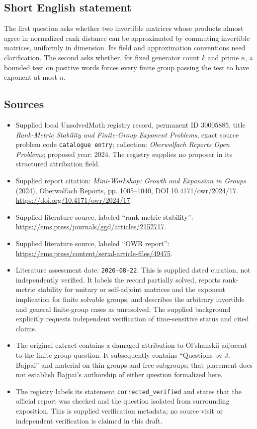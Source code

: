 \documentclass[11pt]{article}
\begin{document}
\subsection{Short English statement}
The first question asks whether two invertible matrices whose products almost agree in normalized rank distance can be approximated by commuting invertible matrices, uniformly in dimension. Its field and approximation conventions need clarification. The second asks whether, for fixed generator count \(k\) and prime \(n\), a bounded test on positive words forces every finite group passing the test to have exponent at most \(n\).
\subsection{Sources}
\begin{itemize}
\item Supplied local UnsolvedMath registry record, permanent ID \(30005885\), title \emph{Rank-Metric Stability and Finite-Group Exponent Problems}, exact source problem code \texttt{catalogue entry}; collection: \emph{Oberwolfach Reports Open Problems}; proposed year: 2024. The registry supplies no proposer in its structured attribution field.
\item Supplied report citation: \emph{Mini-Workshop: Growth and Expansion in Groups} (2024), Oberwolfach Reports, pp. 1005--1040, DOI 10.4171/owr/2024/17. \url{https://doi.org/10.4171/owr/2024/17}.
\item Supplied literature source, labeled ``rank-metric stability'': \url{https://ems.press/journals/ggd/articles/2152717}.
\item Supplied literature source, labeled ``OWR report'': \url{https://ems.press/content/serial-article-files/49475}.
\item Literature assessment date: \texttt{2026-08-22}. This is supplied dated curation, not independently verified. It labels the record partially solved, reports rank-metric stability for unitary or self-adjoint matrices and the exponent implication for finite solvable groups, and describes the arbitrary invertible and general finite-group cases as unresolved. The supplied background explicitly requests independent verification of time-sensitive status and cited claims.
\item The original extract contains a damaged attribution to Ol'shanskii adjacent to the finite-group question. It subsequently contains ``Questions by J. Bajpai'' and material on thin groups and free subgroups; that placement does not establish Bajpai's authorship of either question formalized here.
\item The registry labels its statement \texttt{corrected\_verified} and states that the official report was checked and the question isolated from surrounding exposition. This is supplied verification metadata; no source visit or independent verification is claimed in this draft.
\end{itemize}
\end{document}
